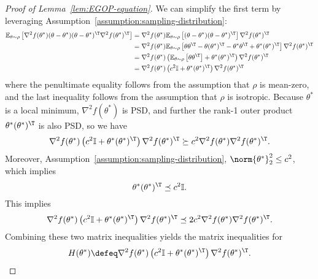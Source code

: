 \begin{proof}[Proof of Lemma~\ref{lem:EGOP-equation}]
   We can simplify the first term by leveraging Assumption~\ref{assumption:sampling-distribution}: 
   \begin{align*}
       \mathbb{E}_{\theta\sim \rho}\left[\nabla^2 f(\theta^*)(\theta-\theta^*)(\theta-\theta^*)^\T \nabla^2 f(\theta^*)^\T\right] &= \nabla^2 f(\theta^*) \mathbb{E}_{\theta\sim \rho}\left[(\theta-\theta^*)(\theta-\theta^*)^\T\right] \nabla^2 f(\theta^*)^\T\\
       &=\nabla^2 f(\theta^*) \mathbb{E}_{\theta\sim \rho}\left[\theta\theta^\T-\theta(\theta^*)^\T -\theta^* \theta^\T + \theta^* (\theta^*)^\T\right] \nabla^2 f(\theta^*)^\T\\
       &=\nabla^2 f(\theta^*) \left(\mathbb{E}_{\theta\sim \rho}\left[\theta\theta^\T\right]+ \theta^* (\theta^*)^\T\right) \nabla^2 f(\theta^*)^\T\\
       &=\nabla^2 f(\theta^*) \left(c^2 \mathbb{I}+ \theta^* (\theta^*)^\T\right) \nabla^2 f(\theta^*)^\T
   \end{align*}
   where the penultimate equality follows from the assumption that $\rho$ is mean-zero, and the last inequality follows from the assumption that $\rho$ is isotropic. Because $\theta^*$ is a local minimum, $\nabla^2 f(\theta^*)$ is PSD, and further the rank-1 outer product $\theta^* (\theta^*)^\T$ is also PSD,  so we have
   \[
    \nabla^2 f(\theta^*) \left(c^2 \mathbb{I}+ \theta^* (\theta^*)^\T\right) \nabla^2 f(\theta^*)^\T \succeq c^2 \nabla^2 f(\theta^*)\nabla^2 f(\theta^*)^\T.
   \]
   Moreover, Assumption~\ref{assumption:sampling-distribution}, $\norm{\theta^*}^2_2\leq c^2$, which implies
   \[
        \theta^* (\theta^*)^\T \preceq c^2 \mathbb{I}.
   \]
   This implies
   \[
    \nabla^2 f(\theta^*) \left(c^2 \mathbb{I}+ \theta^* (\theta^*)^\T\right) \nabla^2 f(\theta^*)^\T \preceq 2c^2 \nabla^2 f(\theta^*)\nabla^2 f(\theta^*)^\T.
   \]
   Combining these two matrix inequalities yields the matrix inequalities for 
   \[
    H(\theta^*) \defeq \nabla^2 f(\theta^*) \left(c^2 \mathbb{I}+ \theta^* (\theta^*)^\T\right) \nabla^2 f(\theta^*)^\T.
   \]


\end{proof}

